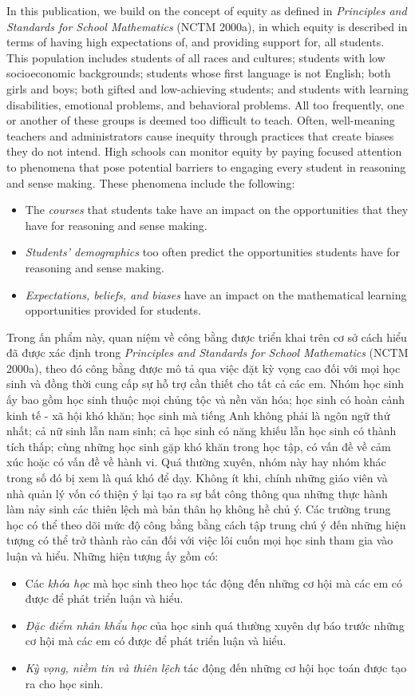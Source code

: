 \documentclass[
  10pt,
  a4paper,
  landscape,
  twoside,
  openany
]{scrbook}
\newcommand{\EN}[1]{#1}
\newcommand{\VI}[1]{#1}
\begin{document}
\TriPara
{
\EN{In this publication, we build on the concept of equity as defined in \emph{Principles and Standards for School Mathematics} (NCTM 2000a), in which equity is described in terms of having high expectations of, and providing support for, all students. This population includes students of all races and cultures; students with low socioeconomic backgrounds; students whose first language is not English; both girls and boys; both gifted and low-achieving students; and students with learning disabilities, emotional problems, and behavioral problems. All too frequently, one or another of these groups is deemed too difficult to teach. Often, well-meaning teachers and administrators cause inequity through practices that create biases they do not intend. High schools can monitor equity by paying focused attention to phenomena that pose potential barriers to engaging every student in reasoning and sense making. These phenomena include the following:

\begin{itemize}
  \item The \emph{courses} that students take have an impact on the opportunities that they have for reasoning and sense making.
  \item \emph{Students' demographics} too often predict the opportunities students have for reasoning and sense making.
  \item \emph{Expectations, beliefs, and biases} have an impact on the mathematical learning opportunities provided for students.
\end{itemize}
}
}
{
\VI{Trong ấn phẩm này, quan niệm về công bằng được triển khai trên cơ sở cách hiểu đã được xác định trong \emph{Principles and Standards for School Mathematics} (NCTM 2000a), theo đó công bằng được mô tả qua việc đặt kỳ vọng cao đối với mọi học sinh và đồng thời cung cấp sự hỗ trợ cần thiết cho tất cả các em. Nhóm học sinh ấy bao gồm học sinh thuộc mọi chủng tộc và nền văn hóa; học sinh có hoàn cảnh kinh tế - xã hội khó khăn; học sinh mà tiếng Anh không phải là ngôn ngữ thứ nhất; cả nữ sinh lẫn nam sinh; cả học sinh có năng khiếu lẫn học sinh có thành tích thấp; cùng những học sinh gặp khó khăn trong học tập, có vấn đề về cảm xúc hoặc có vấn đề về hành vi. Quá thường xuyên, nhóm này hay nhóm khác trong số đó bị xem là quá khó để dạy. Không ít khi, chính những giáo viên và nhà quản lý vốn có thiện ý lại tạo ra sự bất công thông qua những thực hành làm nảy sinh các thiên lệch mà bản thân họ không hề chủ ý. Các trường trung học có thể theo dõi mức độ công bằng bằng cách tập trung chú ý đến những hiện tượng có thể trở thành rào cản đối với việc lôi cuốn mọi học sinh tham gia vào luận và hiểu. Những hiện tượng ấy gồm có:

\begin{itemize}
  \item Các \emph{khóa học} mà học sinh theo học tác động đến những cơ hội mà các em có được để phát triển luận và hiểu.
  \item \emph{Đặc điểm nhân khẩu học} của học sinh quá thường xuyên dự báo trước những cơ hội mà các em có được để phát triển luận và hiểu.
  \item \emph{Kỳ vọng, niềm tin và thiên lệch} tác động đến những cơ hội học toán được tạo ra cho học sinh.
\end{itemize}}
}
\end{document}
